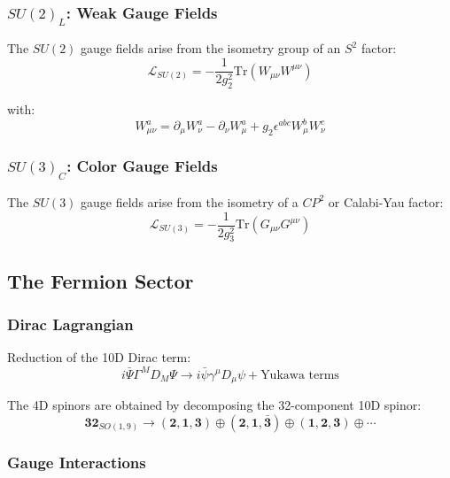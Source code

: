 \subsubsection{$SU(2)_L$: Weak Gauge Fields}

The $SU(2)$ gauge fields arise from the isometry group of an $S^2$ factor:
\begin{equation}
    \mathcal{L}_{SU(2)} = -\frac{1}{2g_2^2}\text{Tr}(W_{\mu\nu}W^{\mu\nu})
\end{equation}

with:
\begin{equation}
    W_{\mu\nu}^a = \partial_\mu W_\nu^a - \partial_\nu W_\mu^a + g_2\epsilon^{abc}W_\mu^b W_\nu^c
\end{equation}

\subsubsection{$SU(3)_C$: Color Gauge Fields}

The $SU(3)$ gauge fields arise from the isometry of a $CP^2$ or Calabi-Yau factor:
\begin{equation}
    \mathcal{L}_{SU(3)} = -\frac{1}{2g_3^2}\text{Tr}(G_{\mu\nu}G^{\mu\nu})
\end{equation}

\subsection{The Fermion Sector}

\subsubsection{Dirac Lagrangian}

Reduction of the 10D Dirac term:
\begin{equation}
    i\bar{\Psi}\Gamma^M D_M \Psi \to i\bar{\psi}\gamma^\mu D_\mu \psi + \text{Yukawa terms}
\end{equation}

The 4D spinors are obtained by decomposing the 32-component 10D spinor:
\begin{equation}
    \mathbf{32}_{SO(1,9)} \to (\mathbf{2}, \mathbf{1}, \mathbf{3}) \oplus (\mathbf{2}, \mathbf{1}, \bar{\mathbf{3}}) \oplus (\mathbf{1}, \mathbf{2}, \mathbf{3}) \oplus \cdots
\end{equation}

\subsubsection{Gauge Interactions}

